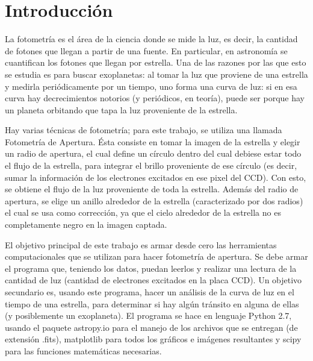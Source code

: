 \documentclass[a4paper, 11pt, spanish]{article}
\begin{document}
\clearpage


\newpage

\tableofcontents %
\listoffigures %

\newpage

\section{Introducci\'on}
La fotometr\'ia es el \'area de la ciencia donde se mide la luz, es decir, la cantidad de fotones que llegan a partir de una fuente. En particular, en astronom\'ia se cuantifican los fotones que llegan por estrella. Una de las razones por las que esto se estudia es para buscar exoplanetas: al tomar la luz que proviene de una estrella y medirla peri\'odicamente por un tiempo, uno forma una curva de luz: si en esa curva hay decrecimientos notorios (y peri\'odicos, en teor\'ia), puede ser porque hay un planeta orbitando que tapa la luz proveniente de la estrella. 

Hay varias t\'ecnicas de fotometr\'ia; para este trabajo, se utiliza una llamada Fotometr\'ia de Apertura. \'Esta consiste en tomar la imagen de la estrella y elegir un radio de apertura, el cual define un c\'irculo dentro del cual debiese estar todo el flujo de la estrella, para integrar el brillo proveniente de ese c\'irculo (es decir, sumar la informaci\'on de los electrones excitados en ese pixel del CCD). Con esto, se obtiene el flujo de la luz proveniente de toda la estrella. Adem\'as del radio de apertura, se elige un anillo alrededor de la estrella (caracterizado por dos radios) el cual se usa como correcci\'on, ya que el cielo alrededor de la estrella no es completamente negro en la imagen captada.


El objetivo principal de este trabajo es armar desde cero las herramientas computacionales que se utilizan para hacer fotometr\'ia de apertura. Se debe armar el programa que, teniendo los datos, puedan leerlos y realizar una lectura de la cantidad de luz (cantidad de electrones excitados en la placa CCD). Un objetivo secundario es, usando este programa, hacer un an\'alisis de la curva de luz en el tiempo de una estrella, para determinar si hay alg\'un tr\'ansito en alguna de ellas (y posiblemente un exoplaneta). El programa se hace en lenguaje Python 2.7, usando el paquete astropy.io para el manejo de los archivos que se entregan (de extensi\'on .fits), matplotlib para todos los gr\'aficos e im\'agenes resultantes y scipy para las funciones matem\'aticas necesarias. 
\end{document}
